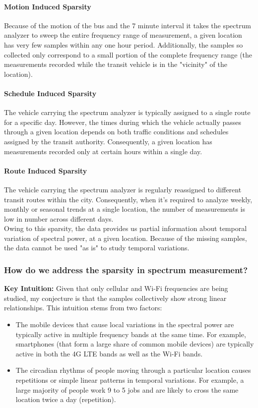 \paragraph{Motion Induced Sparsity} Because of the motion of the bus and the 7 minute interval it takes the spectrum analyzer to sweep the entire frequency range of measurement, a given location has very few samples within any one hour period.
 Additionally, the samples so collected only correspond to a small portion of the complete frequency range (the measurements recorded while the transit vehicle is in the "vicinity" of the location).

\paragraph{Schedule Induced Sparsity} The vehicle carrying the spectrum analyzer is typically assigned to a single route for a specific day.
 However, the times during which the vehicle actually passes through a given location depends on both traffic conditions and schedules assigned by the transit authority.
 Consequently, a given location has measurements recorded only at certain hours within a single day.

\paragraph{Route Induced Sparsity} The vehicle carrying the spectrum analyzer is regularly reassigned to different transit routes within the city.
 Consequently, when it's required to analyze weekly, monthly or seasonal trends at a single location, the number of measurements is low in number across different days.\\

Owing to this sparsity, the data provides us partial information about temporal variation of spectral power, at a given location.
 Because of the missing samples, the data cannot be used "as is" to study temporal variations.

\subsubsection{How do we address the sparsity in spectrum measurement?} \label{subsubsec:KeyIdea}

\textbf{Key Intuition:} Given that only cellular and Wi-Fi frequencies are being studied, my conjecture is that the samples collectively show strong linear relationships.
 This intuition stems from two factors:
\begin{itemize}
\item The mobile devices that cause local variations in the spectral power are typically active in multiple frequency bands at the same time. For example, smartphones (that form a large share of common mobile devices) are typically active in both the 4G LTE bands as well as the Wi-Fi bands.
\item The circadian rhythms of people moving through a particular location causes repetitions or simple linear patterns in temporal variations. For example, a large majority of people work 9 to 5 jobs and are likely to cross the same location twice a day (repetition).
\end{itemize}

